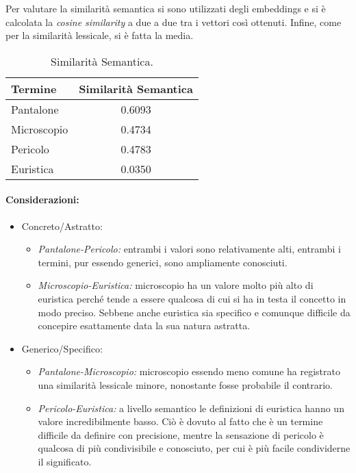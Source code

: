 Per valutare la similarità semantica si sono utilizzati degli embeddings e si è calcolata la \textit{cosine similarity} a due a due tra i vettori così ottenuti. Infine, come per la similarità lessicale, si è fatta la media.

\begin{table}[ht]
\centering
\caption{Similarità Semantica.}
\begin{tabular}{|l|c|}
\hline
Termine & Similarità Semantica \\
\hline
Pantalone & 0.6093 \\ 
\hline
Microscopio & 0.4734 \\ 
\hline
Pericolo & 0.4783\\
\hline
Euristica & 0.0350\\ 
\hline
\end{tabular}
\end{table}

\paragraph{Considerazioni:} 

\begin{itemize}
  \item Concreto/Astratto:
    \begin{itemize}
      \item \textit{Pantalone-Pericolo:} entrambi i valori sono relativamente alti, entrambi i termini, pur essendo generici, sono ampliamente conosciuti. 
      \item \textit{Microscopio-Euristica:} microscopio ha un valore molto più alto di euristica perché tende a essere qualcosa di cui si ha in testa il concetto in modo preciso. Sebbene anche euristica sia specifico e comunque difficile da concepire esattamente data la sua natura astratta.
    \end{itemize}
  \item Generico/Specifico:
    \begin{itemize}
      \item \textit{Pantalone-Microscopio:} microscopio essendo meno comune ha registrato una similarità lessicale minore, nonostante fosse probabile il contrario. 
      \item \textit{Pericolo-Euristica:} a livello semantico le definizioni di euristica hanno un valore incredibilmente basso. Ciò è dovuto al fatto che è un termine difficile da definire con precisione, mentre la sensazione di pericolo è qualcosa di più condivisibile e conosciuto, per cui è più facile condividerne il significato.  
    \end{itemize}
\end{itemize}

